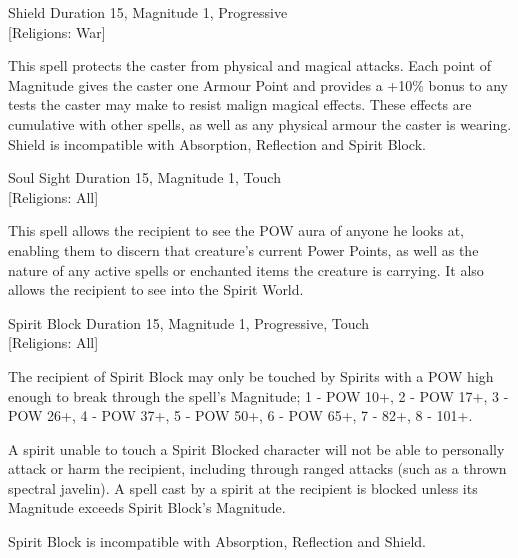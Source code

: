 \begin{samepage}
\begin{rpg-spell}
{Shield}
{Duration 15, Magnitude 1, Progressive\\{[Religions: War]}}

This spell protects the caster from physical and magical attacks. Each point of Magnitude gives the caster one Armour Point and provides a +10\% bonus to any tests the caster may make to resist malign magical effects. These effects are cumulative with other spells, as well as any physical armour the caster is wearing. Shield is incompatible with Absorption, Reflection and Spirit Block. 
\end{rpg-spell}
\end{samepage}

\begin{samepage}
\begin{rpg-spell}
{Soul Sight}
{Duration 15, Magnitude 1, Touch\\{[Religions: All]}}

This spell allows the recipient to see the POW aura of anyone he looks at, enabling them to discern that creature’s current Power Points, as well as the nature of any active spells or enchanted items the creature is carrying. It also allows the recipient to see into the Spirit World. 
\end{rpg-spell}
\end{samepage}

\begin{samepage}
\begin{rpg-spell}
{Spirit Block}
{Duration 15, Magnitude 1, Progressive, Touch\\{[Religions: All]}}

The recipient of Spirit Block may only be touched by Spirits with a POW high enough to break through the spell’s Magnitude; 1 - POW 10+, 2 - POW 17+, 3 - POW 26+, 4 - POW 37+, 5 - POW 50+, 6 - POW 65+, 7 - 82+, 8 - 101+.

A spirit unable to touch a Spirit Blocked character will not be able to personally attack or harm the recipient, including through ranged attacks (such as a thrown spectral javelin). A spell cast by a spirit at the recipient is blocked unless its Magnitude exceeds Spirit Block’s Magnitude. 

Spirit Block is incompatible with Absorption, Reflection and Shield. 
\end{rpg-spell}
\end{samepage}

